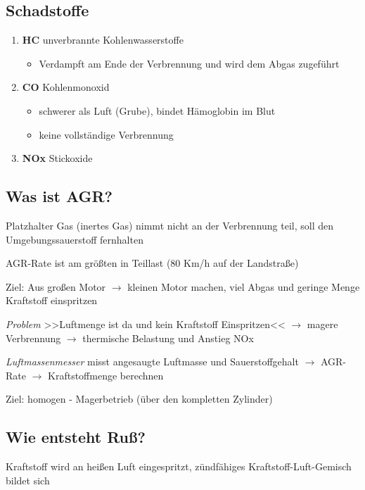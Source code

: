 \subsection{Schadstoffe}\label{schadstoffe}

\begin{enumerate}
\item
  \textbf{HC} unverbrannte Kohlenwasserstoffe

  \begin{itemize}
  \item
    Verdampft am Ende der Verbrennung und wird dem Abgas zugeführt
  \end{itemize}
\item
  \textbf{CO} Kohlenmonoxid

  \begin{itemize}
  \item
    schwerer als Luft (Grube), bindet Hämoglobin im Blut
  \item
    keine vollständige Verbrennung
  \end{itemize}
\item
  \textbf{NOx} Stickoxide
\end{enumerate}

\subsection{Was ist AGR?}\label{was-ist-agr}

Platzhalter Gas (inertes Gas) nimmt nicht an der Verbrennung teil, soll
den Umgebungssauerstoff fernhalten

AGR-Rate ist am größten in Teillast (80 Km/h auf der Landstraße)

Ziel: Aus großen Motor $\to$ kleinen Motor machen, viel Abgas und
geringe Menge Kraftstoff einspritzen

\emph{Problem} >>Luftmenge ist da und kein Kraftstoff Einspritzen<<
$\to$ magere Verbrennung $\to$ thermische Belastung und Anstieg NOx

\emph{Luftmassenmesser} misst angesaugte Luftmasse und Sauerstoffgehalt
$\to$ AGR-Rate $\to$ Kraftstoffmenge berechnen

Ziel: homogen - Magerbetrieb (über den kompletten Zylinder)

\subsection{Wie entsteht Ruß?}\label{wie-entsteht-russ}

Kraftstoff wird an heißen Luft eingespritzt, zündfähiges
Kraftstoff-Luft-Gemisch bildet sich

